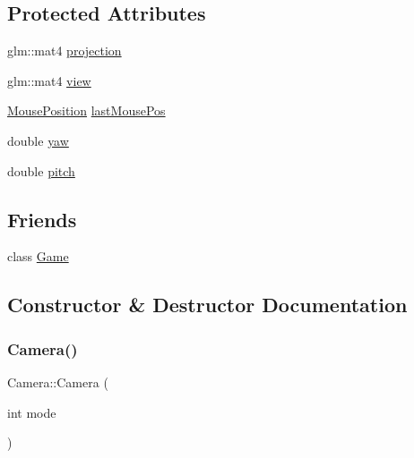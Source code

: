 \subsection*{Protected Attributes}
\begin{DoxyCompactItemize}
\item 
glm\+::mat4 \mbox{\hyperlink{class_camera_a43555a0ae83f9ec696ee257e5fd48cf2}{projection}}
\item 
glm\+::mat4 \mbox{\hyperlink{class_camera_add93fedd6b9a6a6e2c784aeda624de83}{view}}
\item 
\mbox{\hyperlink{struct_mouse_position}{Mouse\+Position}} \mbox{\hyperlink{class_camera_a452e0aabdcd36e235c2f8705b736482c}{last\+Mouse\+Pos}}
\item 
double \mbox{\hyperlink{class_camera_a54536224732656e8f4a419cf11662d3e}{yaw}}
\item 
double \mbox{\hyperlink{class_camera_a481e669a6f96826929e323706543a6a4}{pitch}}
\end{DoxyCompactItemize}
\subsection*{Friends}
\begin{DoxyCompactItemize}
\item 
class \mbox{\hyperlink{class_camera_aa2fab026580d6f14280c2ffb8063a314}{Game}}
\end{DoxyCompactItemize}


\subsection{Constructor \& Destructor Documentation}
\mbox{\label{class_camera_a706e41a11eee92cd3f597386ae860885}} 
\subsubsection{\texorpdfstring{Camera()}{Camera()}\hspace{0.1cm}{\footnotesize\ttfamily [1/2]}}
{\footnotesize\ttfamily Camera\+::\+Camera (\begin{DoxyParamCaption}\item[{int}]{mode }\end{DoxyParamCaption})}

\mbox{\label{class_camera_a01f94c3543f56ede7af49dc778f19331}} 
